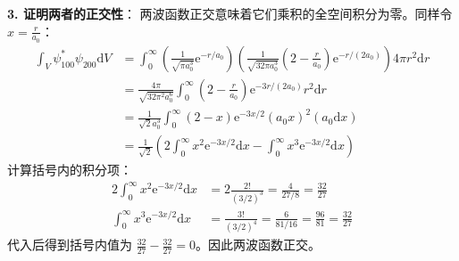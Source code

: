 \begin{solution}
\textbf{3. 证明两者的正交性}：
两波函数正交意味着它们乘积的全空间积分为零。同样令 $x = \frac{r}{a_0}$：
\begin{align*}
    \int_V \psi_{100}^* \psi_{200} \mathrm{d}V &= \int_0^\infty \left( \frac{1}{\sqrt{\pi a_0^3}} \mathrm{e}^{-r/a_0} \right) \left( \frac{1}{\sqrt{32\pi a_0^3}} \left( 2 - \frac{r}{a_0} \right) \mathrm{e}^{-r/(2a_0)} \right) 4\pi r^2 \mathrm{d}r \\
    &= \frac{4\pi}{\sqrt{32\pi^2 a_0^6}} \int_0^\infty \left( 2 - \frac{r}{a_0} \right) \mathrm{e}^{-3r/(2a_0)} r^2 \mathrm{d}r \\
    &= \frac{1}{\sqrt{2} a_0^3} \int_0^\infty (2 - x) \mathrm{e}^{-3x/2} (a_0 x)^2 (a_0 \mathrm{d}x) \\
    &= \frac{1}{\sqrt{2}} \left( 2 \int_0^\infty x^2 \mathrm{e}^{-3x/2} \mathrm{d}x - \int_0^\infty x^3 \mathrm{e}^{-3x/2} \mathrm{d}x \right)
\end{align*}
计算括号内的积分项：
\begin{align*}
    2 \int_0^\infty x^2 \mathrm{e}^{-3x/2} \mathrm{d}x &= 2 \frac{2!}{(3/2)^3} = \frac{4}{27/8} = \frac{32}{27} \\
    \int_0^\infty x^3 \mathrm{e}^{-3x/2} \mathrm{d}x &= \frac{3!}{(3/2)^4} = \frac{6}{81/16} = \frac{96}{81} = \frac{32}{27}
\end{align*}
代入后得到括号内值为 $\frac{32}{27} - \frac{32}{27} = 0$。因此两波函数正交。
\end{solution}

